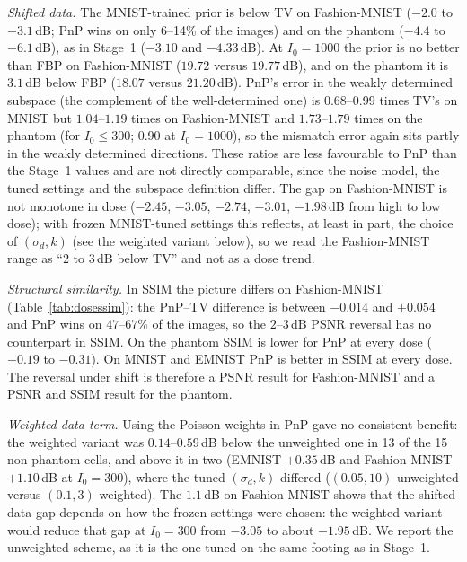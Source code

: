 \emph{Shifted data.} The MNIST-trained prior is below TV on Fashion-MNIST ($-2.0$ to $-3.1$\,dB; PnP wins on only 6--14\% of the images)
and on the phantom ($-4.4$ to $-6.1$\,dB), as in Stage~1 ($-3.10$ and $-4.33$\,dB). At $I_0=1000$ the prior is no better than FBP on Fashion-MNIST
($19.72$ versus $19.77$\,dB), and on the phantom it is $3.1$\,dB below FBP ($18.07$ versus $21.20$\,dB).
PnP's error in the weakly determined subspace (the complement of the well-determined one) is $0.68$--$0.99$ times TV's on MNIST
but $1.04$--$1.19$ times on Fashion-MNIST and $1.73$--$1.79$ times on the phantom (for $I_0\le300$; $0.90$ at $I_0=1000$), so the mismatch error again sits partly in the weakly determined directions. These ratios are less favourable to PnP than the
Stage~1 values and are not directly comparable, since the noise model, the tuned settings and the subspace definition differ. The gap on Fashion-MNIST is not monotone in dose
($-2.45$, $-3.05$, $-2.74$, $-3.01$, $-1.98$\,dB from high to low dose); with frozen MNIST-tuned settings this reflects, at least in part, the choice of $(\sigma_d,k)$ (see the weighted variant below), so
we read the Fashion-MNIST range as ``$2$ to $3$\,dB below TV'' and not as a dose trend.

\emph{Structural similarity.} In SSIM the picture differs on Fashion-MNIST (Table~\ref{tab:dosessim}): the PnP--TV difference is between $-0.014$ and $+0.054$ and PnP wins on
$47$--$67$\% of the images, so the $2$--$3$\,dB PSNR reversal has no counterpart in SSIM. On the phantom SSIM is lower for PnP at every dose ($-0.19$ to $-0.31$). On MNIST and EMNIST PnP is better in SSIM at every dose.
The reversal under shift is therefore a PSNR result for Fashion-MNIST and a PSNR and SSIM result for the phantom.

\emph{Weighted data term.} Using the Poisson weights in PnP gave no consistent benefit: the weighted variant was $0.14$--$0.59$\,dB below the unweighted one in 13 of the 15 non-phantom
cells, and above it in two (EMNIST $+0.35$\,dB and Fashion-MNIST $+1.10$\,dB at $I_0=300$), where the tuned $(\sigma_d,k)$ differed ($(0.05,10)$ unweighted versus $(0.1,3)$ weighted). The
$1.1$\,dB on Fashion-MNIST shows that the shifted-data gap depends on how the frozen settings were chosen: the weighted variant would reduce that gap at $I_0=300$ from $-3.05$ to about $-1.95$\,dB.
We report the unweighted scheme, as it is the one tuned on the same footing as in Stage~1.

